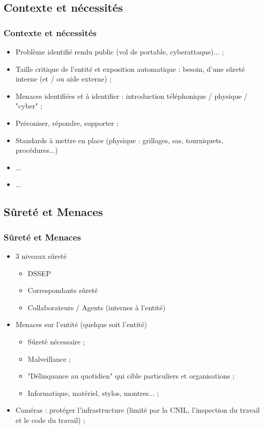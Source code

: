 \documentclass[slidetop,11pt]{beamer}
\begin{document}
\subsection{Contexte et n{\'e}cessit{\'e}s}
\begin{frame}
	\frametitle{Contexte et n{\'e}cessit{\'e}s}
	\begin{itemize}
		\item Probl{\`e}me identifi{\'e} rendu public (vol de portable, cyberattaque)... ; 
		\item Taille critique de l'entit{\'e} et exposition automatique : besoin, d'une s{\^u}ret{\'e} interne (et / ou aide externe) ; 
		\item Menaces identifi{\'e}es et {\`a} identifier : introduction t{\'e}l{\'e}phonique / physique / "cyber" ; 
		\item Pr{\'e}coniser, r{\'e}pondre, supporter ; 
		\item Standards {\`a} mettre en place (physique : grillages, sas, tourniquets, proc{\'e}dures...)
		\item ...
		\item ...
	\end{itemize}
\end{frame}

\subsection{S{\^u}ret{\'e} et Menaces}
\begin{frame}
	\frametitle{S{\^u}ret{\'e} et Menaces}
	\begin{itemize}
		\item 3 niveaux s{\^u}ret{\'e}
		\begin{itemize}
			\item DSSEP
			\item Correspondants s{\^u}ret{\'e}
			\item Collaborateurs / Agents (internes {\`a} l'entit{\'e})
		\end{itemize}
		\item Menaces sur l'entit{\'e} (quelque soit l'entit{\'e})
		\begin{itemize}
			\item S{\^u}ret{\'e} n{\'e}cessaire ; 
			\item Malveillance ; 
			\item "D{\'e}linquance au quotidien" qui cible particuliers et organisations ; 
			\item Informatique, mat{\'e}riel, stylos, montres... ; 
		\end{itemize}
		\item Cam{\'e}ras : prot{\'e}ger l'infrastructure (limit{\'e} par la CNIL, l'inspection du travail et le code du travail) ; 
	\end{itemize}
\end{frame}
\end{document}
